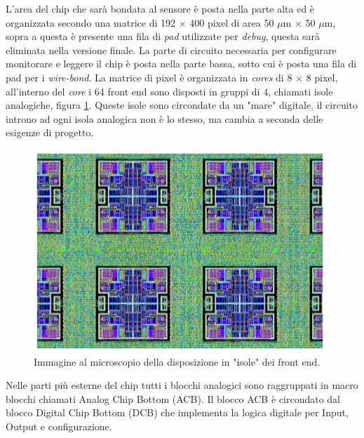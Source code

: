 L'area del chip che sarà bondata al sensore è posta nella parte alta ed è organizzata secondo una matrice di 192 $\times$ 400 pixel di area 50 $\mu$m $\times$ 50 $\mu$m, sopra a questa è presente una fila di \textit{pad} utilizzate per \textit{debug}, questa sarà eliminata nella versione finale. La parte di circuito necessaria per configurare monitorare e leggere il chip è posta nella parte bassa, sotto cui è posta una fila di pad per i \textit{wire-bond}. 
La matrice di pixel è organizzata in \textit{cores} di 8 $\times$ 8 pixel, all'interno del \textit{core} i 64 front end sono disposti in gruppi di 4, chiamati isole analogiche, figura \ref{AnalogIsland}. 
Queste isole sono circondate da un "mare" digitale, il circuito introno ad ogni isola analogica non è lo stesso, ma cambia a seconda delle esigenze di progetto. 
\begin{figure}
\centering
\includegraphics[scale=.5]{Immagini/AnalogIsland}
\caption{Immagine al microscopio della disposizione in "isole" dei front end.}
\label{AnalogIsland}
\end{figure} 
Nelle parti più esterne del chip tutti i blocchi analogici sono raggruppati in macro blocchi chiamati Analog Chip Bottom (ACB). Il blocco ACB è circondato dal blocco Digital Chip Bottom (DCB) che implementa la logica digitale per Input, Output e configurazione. 

